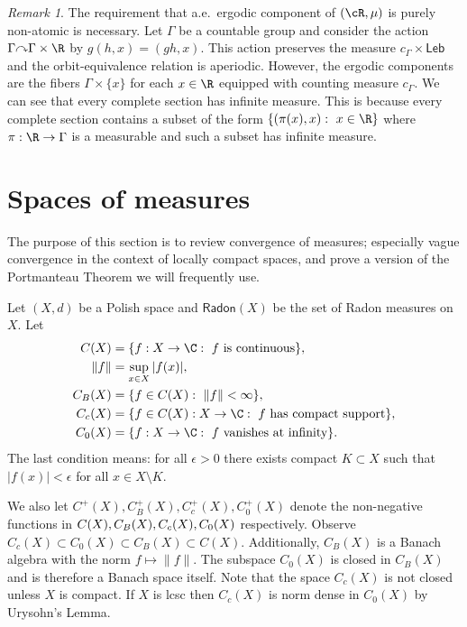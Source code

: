 \documentclass[12pt]{article}
\theoremstyle{plain}
\theoremstyle{definition}
\theoremstyle{remark}
\newtheorem{remark}{Remark}
\newcommand{\G}{\Gamma}
\newcommand{\eps}{\epsilon}
\newcommand\Radon{\mathsf{Radon}}
\def\cc{{\curvearrowright}}
\begin{document}
\begin{remark}
    The requirement that a.e.\ ergodic component of $(\cR, \mu)$ is purely non-atomic is necessary.
    Let $\G$ be a countable group and consider the action $\G \cc \G \times \R$ by $g(h,x)=(gh,x)$. This action preserves the measure $c_\G \times \mathsf{Leb}$ and the orbit-equivalence relation is aperiodic.
    However, the ergodic components are the fibers $\G\times\{x\}$ for each $x\in \R$ equipped with counting measure $c_\G$.
    We can see that every complete section has infinite measure. This is because every complete section contains a subset of the form $\{(\pi(x),x):~x\in \R\}$ where $\pi:\R \to \G$ is a measurable and such a subset has infinite measure.
\end{remark}



\section{Spaces of measures}\label{S:spaces-of-measures}

The purpose of this section is to review convergence of measures; especially vague convergence in the context of locally compact spaces, and prove a version of the Portmanteau Theorem we will frequently use.

Let $(X,d)$ be a Polish space and $\Radon(X)$ be the set of Radon measures on $X$. Let
\begin{align*}
C(X)&=\{f: X \to \C:~ f \textrm{ is continuous}\},\\
\|f\| &= \sup_{x\in X} |f(x)|,\\
C_B(X)&=\{f\in C(X):~\|f\|<\infty \},\\
    C_c(X) &= \{f\in C(X):X \to \C:~f \textrm{ has compact support}\},\\
    C_0(X) &= \{f:X \to \C:~f \textrm{ vanishes at infinity}\}.
\end{align*}
The last condition means: for all $\eps>0$ there exists compact $K \subset X$ such that $|f(x)|<\eps$ for all $x\in X\setminus K$.

We also let $C^+(X), C_B^+(X),C_c^+(X),C_0^+(X)$ denote the non-negative functions in $C(X), \\ C_B(X),C_c(X),C_0(X)$ respectively. Observe $C_c(X) \subset C_0(X) \subset C_B(X) \subset C(X)$. Additionally, $C_B(X)$ is a Banach algebra with the norm $f\mapsto \|f\|$. The subspace $C_0(X)$ is closed in $C_B(X)$ and is therefore a Banach space itself. Note that the space $C_c(X)$ is not closed unless $X$ is compact. If $X$ is lcsc then $C_c(X)$ is norm dense in $C_0(X)$ by Urysohn's Lemma.
\end{document}
